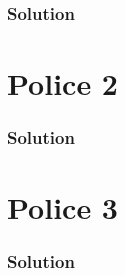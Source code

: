 \documentclass[a4paper, 12pt]{article}
\begin{document}
\subsubsection{Solution}

\section{Police 2}	
\subsubsection{Solution}
	

\section{Police 3}			
\subsubsection{Solution}
	
\end{document}

